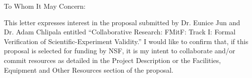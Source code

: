To Whom It May Concern:


This letter expresses interest in the proposal submitted by Dr. Eunice Jun and Dr. Adam Chlipala entitled ``Collaborative Research: FMitF: Track I: Formal Verification of Scientific-Experiment Validity.'' I would like to confirm that, if this proposal is selected for funding by NSF, it is my intent to collaborate and/or commit resources as detailed in the Project Description or the Facilities, Equipment and Other Resources section of the proposal.

